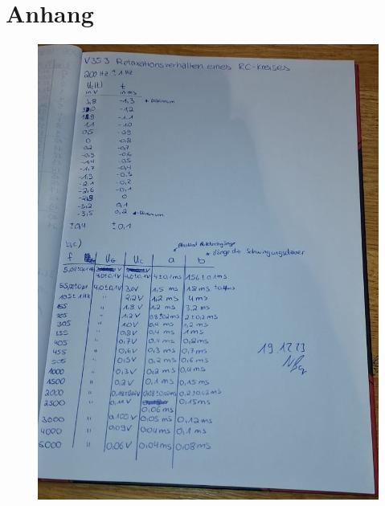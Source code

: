 \section*{Anhang}
\label{sec:Anhang}
\begin{figure}
    \centering
    \includegraphics[width=\textwidth]{messdaten/messdaten.jpg}
\end{figure}
